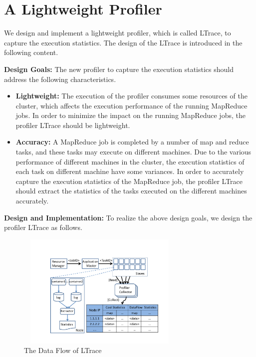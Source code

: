 \section{A Lightweight Profiler}
We design and implement a lightweight profiler, which is called LTrace, to capture the execution statistics. The design of the LTrace is introduced in the following content.

\noindent\textbf{Design Goals: }The new profiler to capture the execution statistics should address the following characteristics.
\begin{itemize}
\item \textbf{Lightweight: }The execution of the profiler consumes some resources of the cluster, which affects the execution performance of the running MapReduce jobs. In order to minimize the impact on the running MapReduce jobs, the profiler LTrace should be lightweight.
\item \textbf{Accuracy: }A MapReduce job is completed by a number of map and reduce tasks, and these tasks may execute on different machines. Due to the various performance of different machines in the cluster, the execution statistics of each task on different machine have some variances. In order to accurately capture the execution statistics of the MapReduce job, the profiler LTrace should extract the statistics of the tasks executed on the different machines accurately.
\end{itemize}

\noindent\textbf{Design and Implementation: }To realize the above design goals, we design the profiler LTrace as follows.

\begin{figure}[htbp]
\begin{center}
\includegraphics[height=5.5cm, width=8cm]{profiler}
\caption{The Data Flow of LTrace}
\label{fig:ltrace}
\end{center}
\end{figure}

